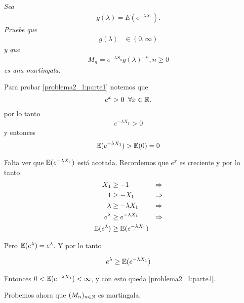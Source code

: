 \emph{
    Sea
        \begin{align}
                g(\lambda)=E(e^{- \lambda X_1}).
        \end{align} 
    Pruebe que 
        \begin{align}
                g(\lambda)    &\in (0,\infty)\label{problema2_1:parte1}
        \end{align}        
    y que
        \begin{align}
                M_n=e^{-\lambda S_n}g(\lambda)^{-n},n\geq 0
        \end{align}
    es una martingala.\\
}
    
    Para probar \eqref{problema2_1:parte1} notemos que
    \begin{align}
        e^x > 0 \;\; \forall x \in \mathbb{R}.
    \end{align}
    por lo tanto
    \begin{align}
        e^{-\lambda X_1} > 0
    \end{align}
    y entonces
    \begin{align}
        \mathbb{E}(e^{-\lambda X_1}) >\mathbb{E}(0) = 0
    \end{align}

    Falta ver que $\mathbb{E}(e^{-\lambda X_1})$ está acotada. Recordemos que $e^x$ es creciente y por lo tanto
    \begin{align}
        X_1                &\geq     -1                       & \Rightarrow\\
        1                  &\geq     - X_1                    & \Rightarrow\\
        \lambda            &\geq     - \lambda X_1            & \Rightarrow\\
        e^{\lambda}        &\geq     e^{- \lambda X_1}        & \Rightarrow\\
        \mathbb{E}(e^{\lambda})    &\geq     \mathbb{E}(e^{- \lambda X_1})
    \end{align}
    
    Pero $\mathbb{E}(e^{\lambda}) = e^{\lambda}$. Y por lo tanto
    
    \begin{align}
        e^{\lambda} \geq  \mathbb{E}(e^{- \lambda X_1})
    \end{align}    
    
    Entonces $0 < \mathbb{E}(e^{-\lambda X_1}) < \infty$, y con esto queda \eqref{problema2_1:parte1}.
    
    Probemos ahora que $(M_n)_{n \in \mathbb{N}}$ es martingala. 
